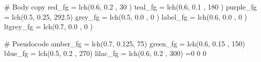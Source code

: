   # Body copy
     red_fg = lch(0.6, 0.2 ,  30  )
    teal_fg = lch(0.6, 0.1 , 180  )
  purple_fg = lch(0.5, 0.25, 292.5)
    grey_fg = lch(0.5, 0.0 ,   0  )
   label_fg = lch(0.6, 0.0 ,   0  )
  ltgrey_fg = lch(0.7, 0.0 ,   0  )

  # Pseudocode
  amber_fg = lch(0.7, 0.125,  75)
  green_fg = lch(0.6, 0.15 , 150)
   blue_fg = lch(0.5, 0.2  , 270)
  lilac_fg = lch(0.6, 0.2  , 300)
\endruby
%
\newtoks\restorecolor \restorecolor={0 0 0}%
%
\long\def\color#1#2{%
  {\restorecolor={#1}\special{color rgb #1}#2}%
  \special{color rgb \the\restorecolor}%
}%
%
\long\def\colorbox#1#2#3{%
  \par
  \advance\hsize by -2em
  \setbox0 = \vbox{#3}%
  \advance\hsize by 2em
  \ifdim \prevdepth > -1000pt
    \vskip-\prevdepth
    \vskip\baselineskip
  \fi
  \vskip0.5\baselineskip
  \dimen0 = \ht0
  \dimen1 = \dp0
  \advance\dimen0 by 0.25\baselineskip %
  \advance\dimen0 by 0.25\baselineskip %
  \advance\dimen1 by 0.20\baselineskip %
  \advance\dimen1 by 0.25\baselineskip %
  \kern -0.25\baselineskip %
  \kern -0.25\baselineskip %
  \color{#1}{\hrule width \hsize height \dimen0 depth \dimen1}%
  \kern -\ht0
  \kern -\dp0
  \kern -0.20\baselineskip %
  \kern -0.25\baselineskip %
  \kern -0.25\baselineskip %
  \kern -0.25\baselineskip %
  \color{#2}{\hrule width 0.5em height \dimen0 depth \dimen1}%
  \kern -\ht0
  \kern -\dp0
  \kern -0.20\baselineskip %
  \kern -0.25\baselineskip %
  \hbox{\hskip1em\box0}
  \vskip0.5\baselineskip
}%
\long\def  \greybox#1{\colorbox{\r{  grey_bg}}{\r{  grey_rbn}}{#1}}%
\long\def\purplebox#1{\colorbox{\r{purple_bg}}{\r{purple_rbn}}{#1}}%
\long\def  \bluebox#1{\colorbox{\r{  blue_bg}}{\r{  blue_rbn}}{#1}}%
\long\def \greenbox#1{\colorbox{\r{ green_bg}}{\r{ green_rbn}}{#1}}%
\long\def\yellowbox#1{\colorbox{\r{yellow_bg}}{\r{yellow_rbn}}{#1}}%
\long\def   \redbox#1{\colorbox{\r{   red_bg}}{\r{   red_rbn}}{#1}}%
%
\long\def\label  #1{\color{\r{ label_fg}}{#1}}%
\long\def\term   #1{\color{\r{purple_fg}}{#1}}%
\long\def\comment#1{\color{\r{  grey_fg}}{{\noto ※ }#1}}%
